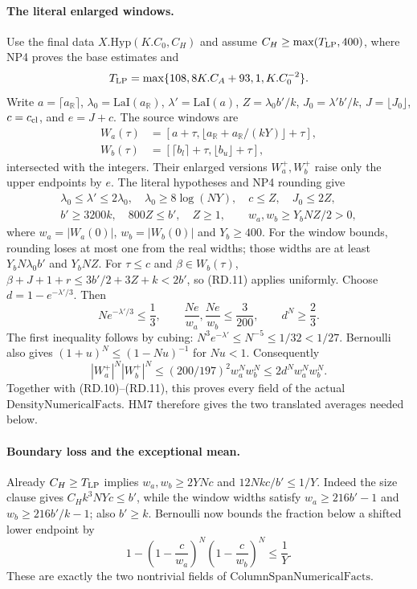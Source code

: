 \documentclass[11pt,a4paper]{article}
\numberwithin{equation}{section}
\theoremstyle{remark}\newtheorem{remark}[theorem]{Remark}
\begin{document}
\paragraph{The literal enlarged windows.}
Use the final data $X.\mathrm{Hyp}(K.C_0,C_H)$ and assume
$C_H\ge\max(T_{\rm LP},400)$, where NP4 proves the base estimates and
\[
 T_{\rm LP}=\max\{108,8K.C_A+93,1,K.C_0^{-2}\}.
\]
Write $a=\lceil a_{\mathbb R}\rceil$,
$\lambda_0=\mathrm{LaI}(a_{\mathbb R})$,
$\lambda' =\mathrm{LaI}(a)$, $Z=\lambda_0b'/k$,
$J_0=\lambda'b'/k$, $J=\lfloor J_0\rfloor$, $c=c_{\rm cl}$,
and $e=J+c$. The source windows are
\[
\begin{aligned}
 W_a(\tau)&=[a+\tau,\lfloor a_{\mathbb R}+a_{\mathbb R}/(kY)\rfloor+\tau],\\
 W_b(\tau)&=[\lceil b_l\rceil+\tau,\lfloor b_u\rfloor+\tau],
\end{aligned}
\]
intersected with the integers. Their enlarged versions $W_a^+,W_b^+$
raise only the upper endpoints by $e$.
The literal hypotheses and NP4 rounding give
\[
\begin{gathered}
 \lambda_0\le\lambda'\le2\lambda_0,\quad
 \lambda_0\ge8\log(NY),\quad c\le Z,\quad J_0\le2Z,\\
 b'\ge3200k,\quad800Z\le b',\quad Z\ge1,\qquad
 w_a,w_b\ge Y_bNZ/2>0,
\end{gathered}
\]
where $w_a=|W_a(0)|$, $w_b=|W_b(0)|$ and $Y_b\ge400$.
For the window bounds, rounding loses at most one from the real widths;
those widths are at least $Y_bN\lambda_0b'$ and $Y_bNZ$.
For $\tau\le c$ and $\beta\in W_b(\tau)$,
$\beta+J+1+r\le3b'/2+3Z+k<2b'$, so (RD.11) applies uniformly.
Choose $d=1-e^{-\lambda'/3}$. Then
\[
 Ne^{-\lambda'/3}\le\frac13,
 \qquad \frac{Ne}{w_a},\frac{Ne}{w_b}\le\frac3{200},
 \qquad d^N\ge\frac23.
\]
The first inequality follows by cubing:
$N^3e^{-\lambda'}\le N^{-5}\le1/32<1/27$.
Bernoulli also gives
$ (1+u)^N\le(1-Nu)^{-1}$ for $Nu<1$.
Consequently
\[
 |W_a^+|^N|W_b^+|^N
 \le(200/197)^2w_a^Nw_b^N
 \le2d^Nw_a^Nw_b^N.
 \tag{RD.12}
\]
Together with (RD.10)--(RD.11), this proves every field of the actual
$\mathrm{DensityNumericalFacts}$. HM7 therefore gives the two translated
averages needed below.

\paragraph{Boundary loss and the exceptional mean.}
Already $C_H\ge T_{\rm LP}$ implies
$w_a,w_b\ge2YNc$ and $12Nkc/b'\le1/Y$.
Indeed the size clause gives $C_Hk^3NYc\le b'$,
while the window widths satisfy
$w_a\ge216b'-1$ and $w_b\ge216b'/k-1$; also $b'\ge k$.
Bernoulli now bounds the fraction below a shifted lower endpoint by
\[
 1-\left(1-\frac c{w_a}\right)^N
       \left(1-\frac c{w_b}\right)^N\le\frac1Y.
 \tag{RD.13}
\]
These are exactly the two nontrivial fields of
$\mathrm{ColumnSpanNumericalFacts}$.
\end{document}
